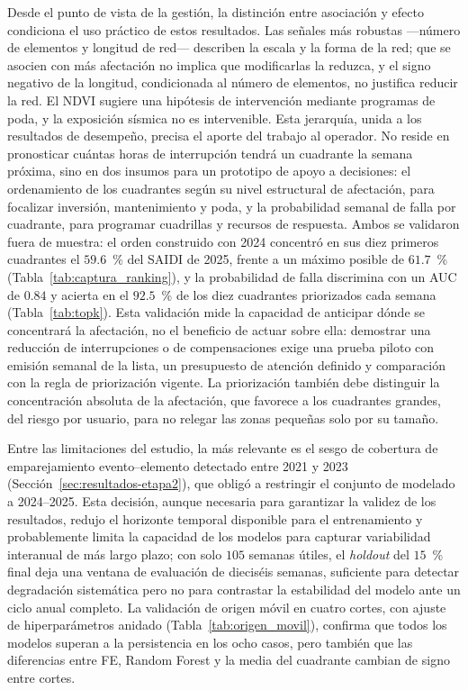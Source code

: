 Desde el punto de vista de la gestión, la distinción entre asociación y efecto condiciona el uso práctico de estos resultados. Las señales más robustas ---número de elementos y longitud de red--- describen la escala y la forma de la red; que se asocien con más afectación no implica que modificarlas la reduzca, y el signo negativo de la longitud, condicionada al número de elementos, no justifica reducir la red. El NDVI sugiere una hipótesis de intervención mediante programas de poda, y la exposición sísmica no es intervenible. Esta jerarquía, unida a los resultados de desempeño, precisa el aporte del trabajo al operador. No reside en pronosticar cuántas horas de interrupción tendrá un cuadrante la semana próxima, sino en dos insumos para un prototipo de apoyo a decisiones: el ordenamiento de los cuadrantes según su nivel estructural de afectación, para focalizar inversión, mantenimiento y poda, y la probabilidad semanal de falla por cuadrante, para programar cuadrillas y recursos de respuesta. Ambos se validaron fuera de muestra: el orden construido con 2024 concentró en sus diez primeros cuadrantes el $59{.}6$~\% del SAIDI de 2025, frente a un máximo posible de $61{.}7$~\% (Tabla~\ref{tab:captura_ranking}), y la probabilidad de falla discrimina con un AUC de $0{.}84$ y acierta en el $92{.}5$~\% de los diez cuadrantes priorizados cada semana (Tabla~\ref{tab:topk}). Esta validación mide la capacidad de anticipar dónde se concentrará la afectación, no el beneficio de actuar sobre ella: demostrar una reducción de interrupciones o de compensaciones exige una prueba piloto con emisión semanal de la lista, un presupuesto de atención definido y comparación con la regla de priorización vigente. La priorización también debe distinguir la concentración absoluta de la afectación, que favorece a los cuadrantes grandes, del riesgo por usuario, para no relegar las zonas pequeñas solo por su tamaño.

Entre las limitaciones del estudio, la más relevante es el sesgo de cobertura de emparejamiento evento--elemento detectado entre 2021 y 2023 (Sección~\ref{sec:resultados-etapa2}), que obligó a restringir el conjunto de modelado a 2024--2025. Esta decisión, aunque necesaria para garantizar la validez de los resultados, redujo el horizonte temporal disponible para el entrenamiento y probablemente limita la capacidad de los modelos para capturar variabilidad interanual de más largo plazo; con solo $105$ semanas útiles, el \emph{holdout} del $15$~\% final deja una ventana de evaluación de dieciséis semanas, suficiente para detectar degradación sistemática pero no para contrastar la estabilidad del modelo ante un ciclo anual completo. La validación de origen móvil en cuatro cortes, con ajuste de hiperparámetros anidado (Tabla~\ref{tab:origen_movil}), confirma que todos los modelos superan a la persistencia en los ocho casos, pero también que las diferencias entre FE, Random Forest y la media del cuadrante cambian de signo entre cortes.

